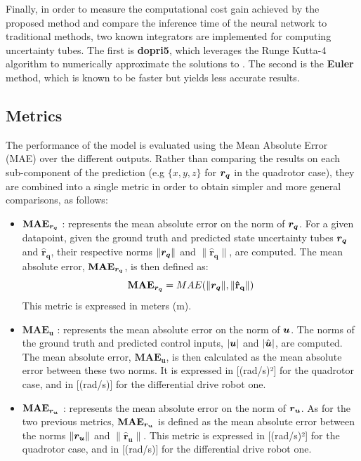 Finally, in order to measure the computational cost gain achieved by the proposed method and compare the inference time of the neural network to traditional methods, two known  integrators are implemented for computing uncertainty tubes.
The first is \textbf{dopri5}, which leverages the Runge Kutta-4 algorithm to numerically approximate the solutions to . 
The second is the \textbf{Euler} method, which is known to be faster but yields less accurate results.

\subsection{Metrics}\label{sec:metric}

The performance of the model is evaluated using the Mean Absolute Error (MAE) over the different outputs. 
Rather than comparing the results on each sub-component of the prediction (e.g $\{x, y, z\}$ for $\boldsymbol{r_q}$ in the quadrotor case), they are combined into a single metric in order to obtain simpler and more general comparisons, as follows:
\begin{itemize}
    \item $\mathbf{MAE_{\boldsymbol{r_q}}}$ : represents the mean absolute error on the norm of $\boldsymbol{r_q}$. 
    For a given datapoint, given the ground truth and predicted state uncertainty tubes $\boldsymbol{r_q}$ and $\mathbf{\hat{r}_q}$, their respective norms $\|\boldsymbol{r_q}\|$ and $\|\mathbf{\hat{r}_q}\|$, are computed. 
    The mean absolute error, $\mathbf{MAE_{\boldsymbol{r_q}}}$, is then defined as:
    \begin{equation}\label{eq:MAE rq}
        \mathbf{MAE_{\boldsymbol{r_q}}} = MAE(\|\boldsymbol{r_q}\|, \|\mathbf{\hat{r}_q}\|)
    \end{equation}
    This metric is expressed in meters (m).
    \item $\mathbf{MAE_{u}}$ : represents the mean absolute error on the norm of $\boldsymbol{u}$. 
    The norms of the ground truth and predicted control inputs, $|\boldsymbol{u}|$ and $|\hat{\boldsymbol{u}}|$, are computed. 
    The mean absolute error, $\mathbf{MAE_{u}}$, is then calculated as the mean absolute error between these two norms. 
    It is expressed in [(rad/s)²] for the quadrotor case, and in [(rad/s)] for the differential drive robot one.
    \item $\mathbf{MAE_{\boldsymbol{r_u}}}$ : represents the mean absolute error on the norm of $\boldsymbol{r_u}$. 
    As for the two previous metrics, $\mathbf{MAE_{\boldsymbol{r_u}}}$ is defined as the mean absolute error between the norms $\|\boldsymbol{r_u}\|$ and $\|\mathbf{\hat{r}_u}\|$. 
    This metric is expressed in [(rad/s)²] for the quadrotor case, and in [(rad/s)] for the differential drive robot one.
\end{itemize}

